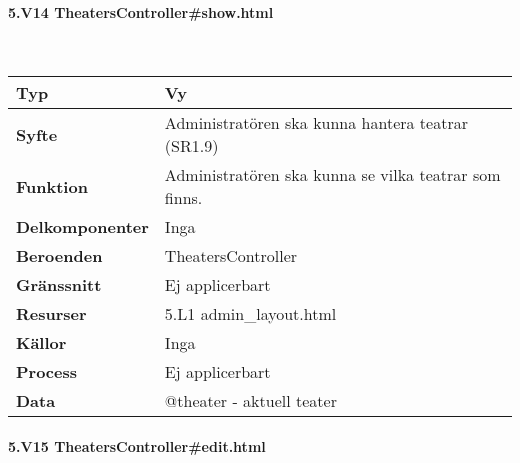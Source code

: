 \documentclass[a4paper, twoside, 11pt, titlepage]{article}
\begin{document}
			\paragraph{5.V14 TheatersController\#show.html}\

			\begin {table} [ht] \begin{tabular} {  p{3.5cm} p{11.6cm} }
				\hline
				{\sffamily\textbf{Typ}} & {Vy} \\
				\hline
				{\sffamily\textbf{Syfte}} & {Administratören ska kunna hantera teatrar (SR1.9)} \\
				\hline
				{\sffamily\textbf{Funktion}} & {Administratören ska kunna se vilka teatrar som finns.} \\
				\hline
				{\sffamily\textbf{Delkomponenter}} & {Inga} \\
				\hline
				{\sffamily\textbf{Beroenden}} & {TheatersController} \\
				\hline
				{\sffamily\textbf{Gränssnitt}} & {Ej applicerbart} \\
				\hline
				{\sffamily\textbf{Resurser}} & {5.L1 admin\_layout.html} \\
				\hline
				{\sffamily\textbf{Källor}} & {Inga} \\
				\hline
				{\sffamily\textbf{Process}} & {Ej applicerbart} \\
				\hline
				{\sffamily\textbf{Data}} & {@theater - aktuell teater} \\
				\hline
			\end{tabular} \end{table} \FloatBarrier


			\clearpage %
			\paragraph{5.V15 TheatersController\#edit.html}\
\end{document}
